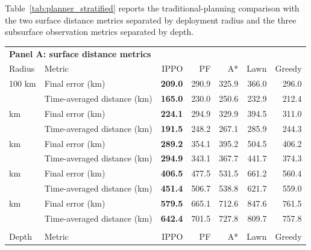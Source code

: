 \documentclass[a4paper,fleqn]{cas-dc}
\begin{document}
Table~\ref{tab:planner_stratified} reports the traditional-planning comparison
with the two surface distance metrics separated by deployment radius and the
three subsurface observation metrics separated by depth.
\begin{center}
\label{tab:planner_stratified}
\footnotesize
\setlength{\tabcolsep}{4pt}
\renewcommand{\arraystretch}{1.04}
\begin{tabular*}{\textwidth}{@{\extracolsep{\fill}}llrrrrr@{}}
\toprule
\multicolumn{7}{l}{\textbf{Panel A: surface distance metrics}}\\
Radius & Metric & IPPO & PF & A* & Lawn & Greedy\\
\midrule
100 km & Final error (km) & \textbf{209.0} & 290.9 & 325.9 & 366.0 & 296.0 \\
 & Time-averaged distance (km) & \textbf{165.0} & 230.0 & 250.6 & 232.9 & 212.4 \\
\addlinespace[1.5pt]
200 km & Final error (km) & \textbf{224.1} & 294.9 & 329.9 & 394.5 & 311.0 \\
 & Time-averaged distance (km) & \textbf{191.5} & 248.2 & 267.1 & 285.9 & 244.3 \\
\addlinespace[1.5pt]
400 km & Final error (km) & \textbf{289.2} & 354.1 & 395.2 & 504.5 & 406.2 \\
 & Time-averaged distance (km) & \textbf{294.9} & 343.1 & 367.7 & 441.7 & 374.3 \\
\addlinespace[1.5pt]
600 km & Final error (km) & \textbf{406.5} & 477.5 & 531.5 & 661.2 & 560.4 \\
 & Time-averaged distance (km) & \textbf{451.4} & 506.7 & 538.8 & 621.7 & 559.0 \\
\addlinespace[1.5pt]
800 km & Final error (km) & \textbf{579.5} & 665.1 & 712.6 & 847.6 & 761.5 \\
 & Time-averaged distance (km) & \textbf{642.4} & 701.5 & 727.8 & 809.7 & 757.8 \\
\addlinespace[1.5pt]
\midrule
\multicolumn{7}{l}{\textbf{Panel B: subsurface metrics by depth}}\\
Depth & Metric & IPPO & PF & A* & Lawn & Greedy\\
\midrule

\end{tabular*}
\end{center}
\end{document}
